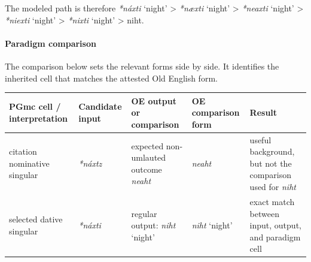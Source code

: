 \documentclass[
  british,
  a4paper,
]{article}
\newcounter{none} %
\providecommand{\Recon}[1]{\emph{*#1}}
\begin{document}
The modeled path is therefore \Recon{náxti} `night' \textgreater{}
\Recon{næxti} `night' \textgreater{} \Recon{neaxti} `night'
\textgreater{} \Recon{niexti} `night' \textgreater{} \Recon{nixti}
`night' \textgreater{} niht.

\paragraph{Paradigm comparison}\label{paradigm-comparison-17}

The comparison below sets the relevant forms side by side. It identifies
the inherited cell that matches the attested Old English form.

{\def\LTcaptype{none} %
\begin{longtable}[]{@{}
  >{\raggedright\arraybackslash}p{}
  >{\raggedright\arraybackslash}p{}
  >{\raggedright\arraybackslash}p{}
  >{\raggedright\arraybackslash}p{}
  >{\raggedright\arraybackslash}p{}@{}}
\toprule\noalign{}
\begin{minipage}[b]{\linewidth}\raggedright
PGmc cell / interpretation
\end{minipage} & \begin{minipage}[b]{\linewidth}\raggedright
Candidate input
\end{minipage} & \begin{minipage}[b]{\linewidth}\raggedright
OE output or comparison
\end{minipage} & \begin{minipage}[b]{\linewidth}\raggedright
OE comparison form
\end{minipage} & \begin{minipage}[b]{\linewidth}\raggedright
Result
\end{minipage} \\
\midrule\noalign{}
\endhead
\bottomrule\noalign{}
\endlastfoot
citation nominative singular & {\emph{*náxtz}} & expected non-umlauted
outcome {\emph{neaht}} & {\emph{neaht}} & useful background, but not the
comparison used for \emph{niht} \\
selected dative singular & {\emph{*náxti}} & regular output:
{\emph{niht}} `night' & {\emph{niht}} `night' & exact match between
input, output, and paradigm cell \\
\end{longtable}
}
\end{document}
